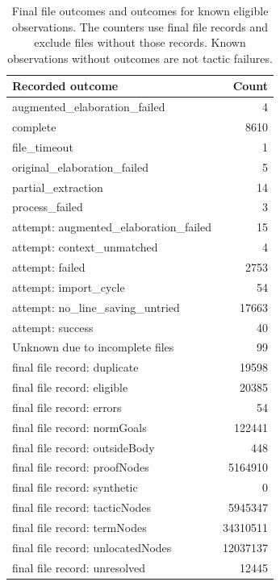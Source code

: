 \begin{table}[!htbp]\centering\small
\caption{Final file outcomes and outcomes for known eligible observations. The counters use final file records and exclude files without those records. Known observations without outcomes are not tactic failures.}
\begin{tabular}{lr}\toprule
Recorded outcome & Count\\\midrule
augmented\_elaboration\_failed & 4\\
complete & 8610\\
file\_timeout & 1\\
original\_elaboration\_failed & 5\\
partial\_extraction & 14\\
process\_failed & 3\\
attempt: augmented\_elaboration\_failed & 15\\
attempt: context\_unmatched & 4\\
attempt: failed & 2753\\
attempt: import\_cycle & 54\\
attempt: no\_line\_saving\_untried & 17663\\
attempt: success & 40\\
Unknown due to incomplete files & 99\\
final file record: duplicate & 19598\\
final file record: eligible & 20385\\
final file record: errors & 54\\
final file record: normGoals & 122441\\
final file record: outsideBody & 448\\
final file record: proofNodes & 5164910\\
final file record: synthetic & 0\\
final file record: tacticNodes & 5945347\\
final file record: termNodes & 34310511\\
final file record: unlocatedNodes & 12037137\\
final file record: unresolved & 12445\\
\bottomrule\end{tabular}\end{table}
